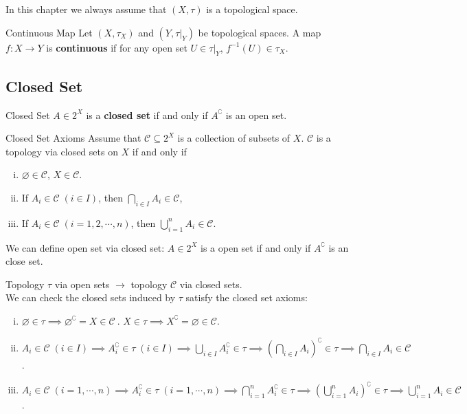 \documentclass{report}
\begin{document}
\noindent In this chapter we always assume that $(X,\tau)$ is a topological space.

\begin{definition}{Continuous Map}{}
	Let $(X,\tau_X)$ and $(Y,\tau |_Y)$ be topological spaces. A map $f:X\to Y$ is \textbf{continuous} if for any open set $U\in\tau |_Y$, $f^{-1}(U)\in\tau_X$.
\end{definition}


\subsection{Closed Set}
\begin{definition}{Closed Set}{}
	$A\in 2^X$ is a \textbf{closed set} if and only if $A^{\complement}$ is an open set.
\end{definition}

\begin{definition}{Closed Set Axioms}{}
	Assume that $\mathcal{C}\subseteq2^X $ is a collection of subsets of $X$. $\mathcal{C}$ is a topology via closed sets on $X$ if and only if
	\begin{enumerate}[(i)]
		\item $\varnothing\in \mathcal{C}$, $X\in \mathcal{C}$.
		\item If $A_i\in\mathcal{C}\;(i\in I)$, then $\bigcap\limits_{i\in I}A_i\in \mathcal{C}$,
		\item If $A_i\in\mathcal{C}\;(i=1,2,\cdots,n)$, then $\bigcup\limits_{i=1}^nA_i\in \mathcal{C}$.
	\end{enumerate}
	We can define open set via closed set: $A\in 2^X$ is a open set if and only if $A^{\complement}$ is an close set.
\end{definition}


\begin{prf}
	Topology $\tau$ via open sets $\rightarrow$ topology $\mathcal{C}$ via closed sets.\\
	We can check the closed sets induced by $\tau$ satisfy the closed set axioms:
	\begin{enumerate}[(i)]
		\item $\varnothing\in \tau\implies\varnothing^{\complement}=X\in \mathcal{C} \ $. $X\in \tau\implies X^{\complement}=\varnothing\in \mathcal{C}$.
		\item $A_i\in\mathcal{C}\;(i\in I)\implies A_i^{\complement}\in\tau\;(i\in I)\implies\bigcup\limits_{i\in I}A_i^{\complement}\in \tau\implies \left(\bigcap\limits_{i\in I}A_i\right)^{\complement}\in \tau\implies\bigcap\limits_{i\in I}A_i\in\mathcal{C}$.
		\item $A_i\in\mathcal{C}\;(i=1,\cdots,n)\implies A_i^{\complement}\in\tau\;(i=1,\cdots,n)\implies\bigcap\limits_{i=1}^nA_i^{\complement}\in \tau\implies \left(\bigcup\limits_{i=1}^nA_i\right)^{\complement}\in \tau\implies\bigcup\limits_{i=1}^nA_i\in\mathcal{C}$.
	\end{enumerate}
\end{prf}
\end{document}

